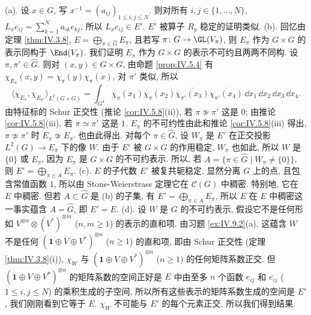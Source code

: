 \begin{solution}
(a). 设 $x \in G$, 写 $x^{-1} = (a_{ij})_{1 \leq i,j \leq N}$. 则对所有 $i, j \in \{1, \ldots, N\}$, $L_xe_{ij} = \sum_{k=1}^N a_{ik}e_{kj}$, 所以 $L_xe_{ij} \in E'$. $E'$ 被算子 $R_y$ 稳定的证明类似.
(b). 回忆由定理 \ref{thm:IV.3.8}, $E = \bigoplus_{\pi \in \widehat{G}}E_{\pi}$, 且若写 $\pi \colon G \to \GL(V_{\pi})$, 则 $E_{\pi}$ 作为 $G \times G$ 的表示同构于 $\End(V_{\pi})$. 我们证明 $E_{\pi}$ 作为 $G \times G$ 的表示不可约且两两不同构. 设 $\pi, \pi' \in \widehat{G}$. 则对 $(x, y) \in G \times G$, 由命题 \ref{prop:IV.5.4} 有 $\chi_{E_{\pi}}(x, y) = \chi_{\pi}(y)\chi_{\pi}(x)$, 对 $\pi'$ 类似, 所以
\[
\langle \chi_{E_{\pi}}, \chi_{E_{\pi'}} \rangle_{L^2(G \times G)} = \int_{G^4}\chi_{\pi}(x_1)\chi_{\pi}(x_2)\overline{\chi_{\pi'}(x_3)}\overline{\chi_{\pi'}(x_4)}\,\dd x_1\,\dd x_2\,\dd x_3\,\dd x_4.
\]
由特征标的 Schur 正交性 (推论 \ref{cor:IV.5.8}(ii)), 若 $\pi \not\simeq \pi'$ 这是 $0$; 由推论 \ref{cor:IV.5.8}(iii), 若 $\pi \simeq \pi'$ 这是 $1$. $E_{\pi}$ 的不可约性由此和推论 \ref{cor:IV.5.8}(iii) 得出, $\pi \not\simeq \pi'$ 时 $E_{\pi} \not\simeq E_{\pi'}$ 也由此得出.
对每个 $\pi \in \widehat{G}$, 设 $W_{\pi}$ 是 $E'$ 在正交投影 $L^2(G) \to E_{\pi}$ 下的像 $W$. 由于 $E'$ 被 $G \times G$ 的作用稳定, $W_{\pi}$ 也如此, 所以 $W$ 是 $\{0\}$ 或 $E_{\pi}$, 因为 $E_{\pi}$ 是 $G \times G$ 的不可约表示. 所以, 若 $A = \{\pi \in \widehat{G} \mid W_{\pi} \neq \{0\}\}$, 则 $E' = \bigoplus_{\pi \in A}E_{\pi}$.
(c). $E$ 的子代数 $E'$ 被复共轭稳定, 显然分离 $G$ 上的点, 且包含常值函数 $1$, 所以由 Stone-Weierstrass 定理它在 $\mathcal{C}(G)$ 中稠密. 特别地, 它在 $E$ 中稠密. 但若 $A \subset \widehat{G}$ 是 (b) 的子集, 有 $E' = \bigoplus_{\pi \in A}E_{\pi}$, 所以 $E$ 在 $E$ 中稠密这一事实蕴含 $A = \widehat{G}$, 即 $E' = E$.
(d). 设 $W$ 是 $G$ 的不可约表示, 假设它不是任何形如 $V^{\otimes n} \otimes (V^*)^{\otimes m}$ ($n, m \geq 1$) 的表示的直和项. 由习题 \ref{ex:IV.9.2}(a), 这蕴含 $W$ 不是任何 $(\mathbf{1} \oplus V \oplus V^*)^{\otimes n}$ ($n \geq 1$) 的直和项, 即由 Schur 正交性 (定理 \ref{thm:IV.3.8}(i)), $\chi_W$ 与 $(\mathbf{1} \oplus V \oplus V^*)^{\otimes n}$ ($n \geq 1$) 的任何矩阵系数正交. 但 $(\mathbf{1} \oplus V \oplus V^*)^{\otimes n}$ 的矩阵系数的空间正好是 $E$ 中由至多 $n$ 个函数 $e_{ij}$ 和 $\overline{e_{ij}}$ ($1 \leq i, j \leq N$) 的乘积生成的子空间, 所以所有这些表示的矩阵系数生成的空间是 $E'$, 我们刚刚看到它等于 $E$. $\chi_W$ 不可能与 $E'$ 的每个元素正交, 所以我们得到结果.
\end{solution}
